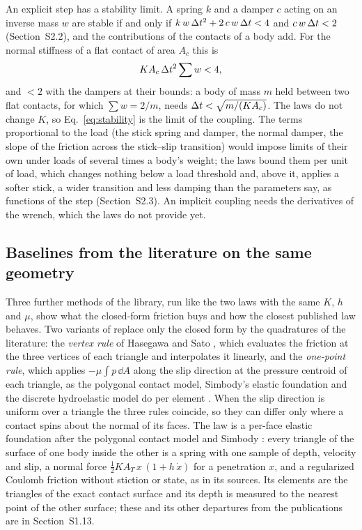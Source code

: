 An explicit step has a stability limit. A spring $k$ and a damper $c$ acting on an inverse mass
$w$ are stable if and only if $k\,w\,\Delta t^2 + 2\,c\,w\,\Delta t < 4$ and $c\,w\,\Delta t < 2$
(Section~S2.2), and the contributions of the contacts of a body add. For the normal stiffness
of a flat contact of area $A_c$ this is
\begin{equation}
  K A_c\,\Delta t^2 \sum w < 4 ,
  \label{eq:stability}
\end{equation}
and $< 2$ with the dampers at their bounds: a body of mass $m$ held between two flat contacts,
for which $\sum w = 2/m$, needs $\Delta t < \sqrt{m/(K A_c)}$. The laws do not change $K$, so
Eq.~\eqref{eq:stability} is the limit of the coupling. The terms proportional to the load (the
stick spring and damper, the normal damper, the slope of the friction across the stick--slip
transition) would impose limits of their own under loads of several times a body's weight; the
laws bound them per unit of load, which changes nothing below a load threshold and, above it,
applies a softer stick, a wider transition and less damping than the parameters say, as
functions of the step (Section~S2.3). An implicit coupling needs the derivatives of the wrench,
which the laws do not provide yet.

\subsection{Baselines from the literature on the same geometry}\label{sec:baselines}


Three further methods of the library, run like the two laws with the same $K$, $h$ and $\mu$,
show what the closed-form friction buys and how the closest published law behaves. Two variants
of  replace only the closed form by the quadratures of the literature: the
\emph{vertex rule} of Hasegawa and Sato \cite{Hasegawa2004}, which evaluates the friction at
the three vertices of each triangle and interpolates it linearly, and the \emph{one-point rule},
which applies $-\mu\int p\,\dd A$ along the slip direction at the pressure centroid of each
triangle, as the polygonal contact model, Simbody's elastic foundation and the discrete
hydroelastic model do per element \cite{Hippmann2024,Sherman2011,Masterjohn2022}. When the slip
direction is uniform over a triangle the three rules coincide, so they can differ only where a
contact spins about the normal of its faces. The law  is a per-face elastic foundation
after the polygonal contact model \cite{Hippmann2004,Hippmann2024} and Simbody
\cite{Sherman2011,SimbodyEFF}: every triangle of the surface of one body inside the other is a
spring with one sample of depth, velocity and slip, a normal force
$\tfrac12 K A_T\,x\,(1 + h\,\dot x)$ for a penetration $x$, and a regularized Coulomb friction
without stiction or state, as in its sources. Its elements are the triangles of the exact
contact surface and its depth is measured to the nearest point of the other surface; these and
its other departures from the publications are in Section~S1.13.
